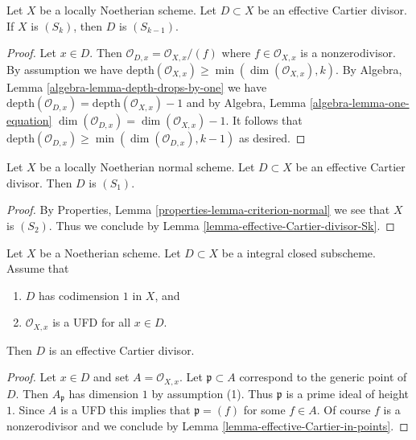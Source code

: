 \begin{lemma}
\label{lemma-effective-Cartier-divisor-Sk}
Let $X$ be a locally Noetherian scheme. Let $D \subset X$ be an
effective Cartier divisor. If $X$ is $(S_k)$, then $D$ is $(S_{k - 1})$.
\end{lemma}

\begin{proof}
Let $x \in D$. Then $\mathcal{O}_{D, x} = \mathcal{O}_{X, x}/(f)$ where
$f \in \mathcal{O}_{X, x}$ is a nonzerodivisor. By assumption we have
$\text{depth}(\mathcal{O}_{X, x}) \geq \min(\dim(\mathcal{O}_{X, x}), k)$.
By Algebra, Lemma \ref{algebra-lemma-depth-drops-by-one} we have
$\text{depth}(\mathcal{O}_{D, x}) = \text{depth}(\mathcal{O}_{X, x}) - 1$
and by Algebra, Lemma \ref{algebra-lemma-one-equation}
$\dim(\mathcal{O}_{D, x}) = \dim(\mathcal{O}_{X, x}) - 1$.
It follows that
$\text{depth}(\mathcal{O}_{D, x}) \geq \min(\dim(\mathcal{O}_{D, x}), k - 1)$
as desired.
\end{proof}

\begin{lemma}
\label{lemma-normal-effective-Cartier-divisor-S1}
Let $X$ be a locally Noetherian normal scheme. Let $D \subset X$ be an
effective Cartier divisor. Then $D$ is $(S_1)$.
\end{lemma}

\begin{proof}
By Properties, Lemma \ref{properties-lemma-criterion-normal}
we see that $X$ is $(S_2)$. Thus we conclude by
Lemma \ref{lemma-effective-Cartier-divisor-Sk}.
\end{proof}

\begin{lemma}
\label{lemma-weil-divisor-is-cartier-UFD}
Let $X$ be a Noetherian scheme. Let $D \subset X$ be a integral
closed subscheme. Assume that
\begin{enumerate}
\item $D$ has codimension $1$ in $X$, and
\item $\mathcal{O}_{X, x}$ is a UFD for all $x \in D$.
\end{enumerate}
Then $D$ is an effective Cartier divisor.
\end{lemma}

\begin{proof}
Let $x \in D$ and set $A = \mathcal{O}_{X, x}$. Let $\mathfrak p \subset A$
correspond to the generic point of $D$. Then $A_\mathfrak p$ has dimension
$1$ by assumption (1). Thus $\mathfrak p$ is a prime ideal of height $1$.
Since $A$ is a UFD this implies that $\mathfrak p = (f)$ for some $f \in A$.
Of course $f$ is a nonzerodivisor and we conclude by
Lemma \ref{lemma-effective-Cartier-in-points}.
\end{proof}

